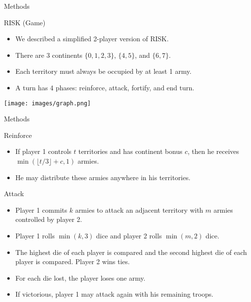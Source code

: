 \documentclass{beamer}
\begin{document}

\begin{frame}{Methods}

\begin{block}{RISK (Game) \cite{risk1959}}
\begin{itemize}
\item We described a simplified 2-player version of RISK.
\item There are 3 continents $\{0, 1, 2, 3\}$, $\{4, 5\}$, and $\{6, 7\}$.
\item Each territory must always be occupied by at least 1 army.
\item A turn has 4 phases: reinforce, attack, fortify, and end turn.
\end{itemize}
\end{block}

\begin{center} \texttt{[image: images/graph.png]} \end{center}

\end{frame}


\begin{frame}{Methods}

\begin{block}{Reinforce \cite{risk1959}}
\begin{itemize}
\item If player 1 controls $t$ territories and has continent bonus $c$, then he receives $\min(\lfloor t/3\rfloor + c, 1)$ armies.
\item He may distribute these armies anywhere in his territories.
\end{itemize}
\end{block}

\begin{block}{Attack \cite{risk1959}}
\begin{itemize}
\item Player 1 commits $k$ armies to attack an adjacent territory with $m$ armies controlled by player 2.
\item Player 1 rolls $\min(k, 3)$ dice and player 2 rolls $\min(m, 2)$ dice.
\item The highest die of each player is compared and the second highest die of each player is compared. Player 2 wins ties.
\item For each die lost, the player loses one army.
\item If victorious, player 1 may attack again with his remaining troops.
\end{itemize}
\end{block}

\end{frame}
\end{document}

